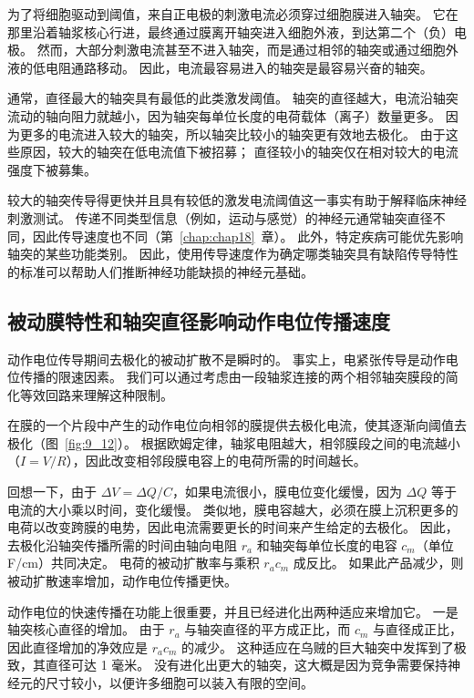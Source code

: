 为了将细胞驱动到阈值，来自正电极的刺激电流必须穿过细胞膜进入轴突。
它在那里沿着轴浆核心行进，最终通过膜离开轴突进入细胞外液，到达第二个（负）电极。
然而，大部分刺激电流甚至不进入轴突，而是通过相邻的轴突或通过细胞外液的低电阻通路移动。
因此，电流最容易进入的轴突是最容易兴奋的轴突。


通常，直径最大的轴突具有最低的此类激发阈值。
轴突的直径越大，电流沿轴突流动的轴向阻力就越小，因为轴突每单位长度的电荷载体（离子）数量更多。
因为更多的电流进入较大的轴突，所以轴突比较小的轴突更有效地去极化。
由于这些原因，较大的轴突在低电流值下被招募；
直径较小的轴突仅在相对较大的电流强度下被募集。


较大的轴突传导得更快并且具有较低的激发电流阈值这一事实有助于解释临床神经刺激测试。
传递不同类型信息（例如，运动与感觉）的神经元通常轴突直径不同，因此传导速度也不同（第~\ref{chap:chap18}~章）。
此外，特定疾病可能优先影响轴突的某些功能类别。
因此，使用传导速度作为确定哪类轴突具有缺陷传导特性的标准可以帮助人们推断神经功能缺损的神经元基础。



\subsection{被动膜特性和轴突直径影响动作电位传播速度}

动作电位传导期间去极化的被动扩散不是瞬时的。
事实上，电紧张传导是动作电位传播的限速因素。
我们可以通过考虑由一段轴浆连接的两个相邻轴突膜段的简化等效回路来理解这种限制。


在膜的一个片段中产生的动作电位向相邻的膜提供去极化电流，使其逐渐向阈值去极化（图~\ref{fig:9_12}）。 
根据欧姆定律，轴浆电阻越大，相邻膜段之间的电流越小（$I = V / R$），因此改变相邻段膜电容上的电荷所需的时间越长。


回想一下，由于 $\Delta V = \Delta Q / C$，如果电流很小，膜电位变化缓慢，因为 $\Delta Q$ 等于电流的大小乘以时间，变化缓慢。
类似地，膜电容越大，必须在膜上沉积更多的电荷以改变跨膜的电势，因此电流需要更长的时间来产生给定的去极化。
因此，去极化沿轴突传播所需的时间由轴向电阻 $r_a$ 和轴突每单位长度的电容 $c_m$（单位 F/cm）共同决定。
电荷的被动扩散率与乘积 $r_a c_m$ 成反比。
如果此产品减少，则被动扩散速率增加，动作电位传播更快。


动作电位的快速传播在功能上很重要，并且已经进化出两种适应来增加它。
一是轴突核心直径的增加。
由于 $r_a$ 与轴突直径的平方成正比，而 $c_m$ 与直径成正比，因此直径增加的净效应是 $r_a c_m$ 的减少。
这种适应在乌贼的巨大轴突中发挥到了极致，其直径可达 1 毫米。
没有进化出更大的轴突，这大概是因为竞争需要保持神经元的尺寸较小，以便许多细胞可以装入有限的空间。


